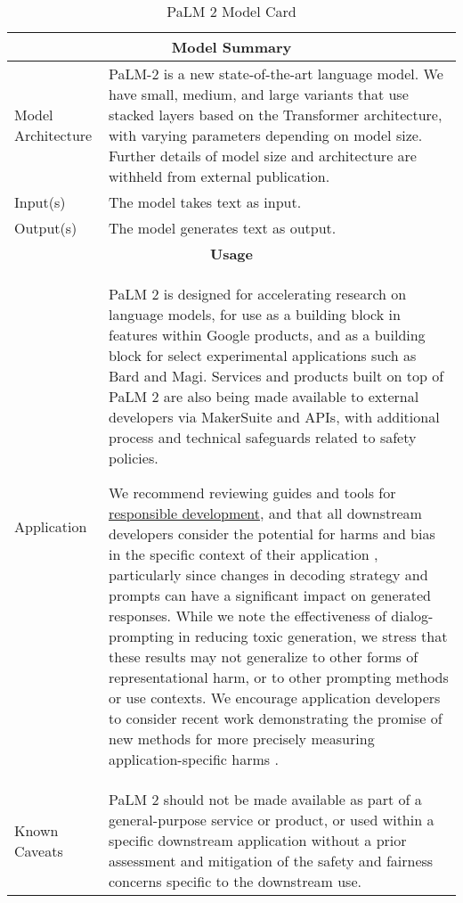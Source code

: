\begin{longtable}[c]{ p{} | p{} } 
\caption{PaLM 2 Model Card}


\\ \toprule

\multicolumn{2}{c}{\textbf{Model Summary}}      \\ \toprule

\multicolumn{1}{l|}{Model Architecture} & PaLM-2 is a new state-of-the-art language model. We have small, medium, and large variants that use stacked layers based on the Transformer architecture, with varying parameters depending on model size. Further details of model size and architecture are withheld from external publication. \\ \midrule
\multicolumn{1}{l|}{Input(s)} & The model takes text as input.
\\ \midrule
\multicolumn{1}{l|}{Output(s)} & The model generates text as output.
\\
\toprule


\multicolumn{2}{c}{\textbf{Usage}}      \\ \toprule
\multicolumn{1}{l|}{Application} & PaLM 2 is designed for accelerating research on language models, for use as a building block in features within Google products, and as a building block for select experimental applications such as Bard and Magi. Services and products built on top of PaLM 2 are also being made available to external developers via MakerSuite and APIs, with additional process and technical safeguards related to safety policies. \vspace{0.1in}

We recommend reviewing guides and tools for \href{https://ai.google/responsibilities/responsible-ai-practices/}{responsible development}, and that all downstream developers consider the potential for harms and bias in the specific context of their application \cite{shelby2023identifying}, particularly since changes in decoding strategy and prompts can have a significant impact on generated responses.  While we note the effectiveness of dialog-prompting in reducing toxic generation, we stress that these results may not generalize to other forms of representational harm, or to other prompting methods or use contexts.  We encourage application developers to consider recent work demonstrating the promise of new methods for more precisely measuring application-specific harms \citep{mozes2023agile}.

\\ 
\midrule
\multicolumn{1}{l|}{Known Caveats} & PaLM 2 should not be made available as part of a general-purpose service or product, or used within a specific downstream application without a prior assessment and mitigation of the safety and fairness concerns specific to the downstream use.    \\
\toprule


\end{longtable}
